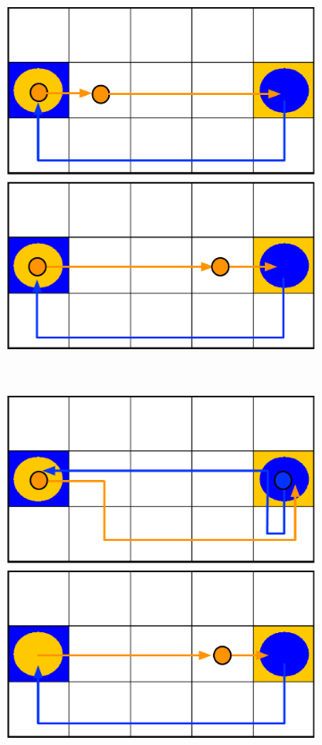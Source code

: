 \begin{figure}
\begin{subfigure}[b]{0.18\textwidth}
        \includegraphics[width=\textwidth]{figures/interactive4}
        \caption{}
        \label{fig:inter4}
    \end{subfigure}
    ~ %
    \begin{subfigure}[b]{0.18\textwidth}
        \includegraphics[width=\textwidth]{figures/interactive5}

\end{subfigure}
\end{figure}
